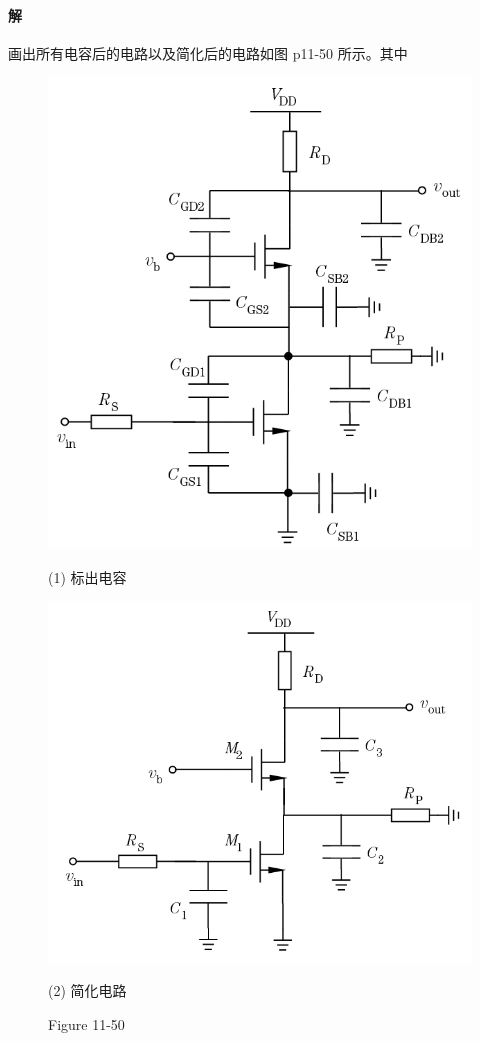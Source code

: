 \documentclass[hyperref, UTF8]{ctexart}
\begin{document}
\paragraph{解}
    画出所有电容后的电路以及简化后的电路如图 p11-50 所示。其中
    \begin{figure}[!htb]
        \centering
        \begin{minipage}[t]{0.408\textwidth}
        \centering
        \includegraphics[width=1\textwidth]{p11-50-sol1.png}
        \caption*{(1) 标出电容}
        \end{minipage}
        \begin{minipage}[t]{0.433\textwidth}
        \centering
        \includegraphics[width=1\textwidth]{p11-50-sol2.png}
        \caption*{(2) 简化电路}
        \end{minipage}
        \caption*{Figure 11-50}
    \end{figure}        
\end{document}
